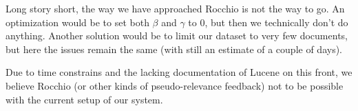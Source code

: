 \documentclass[11pt]{article}
\begin{document}
Long story short, the way we have approached Rocchio is not the way to go. An optimization would be to set both $\beta$ and $\gamma$ to 0, but then we technically don't do anything. Another solution would be to limit our dataset to very few documents, but here the issues remain the same (with still an estimate of a couple of days).

Due to time constrains and the lacking documentation of Lucene on this front, we believe Rocchio (or other kinds of pseudo-relevance feedback) not to be possible with the current setup of our system.

\clearpage


\end{document}
